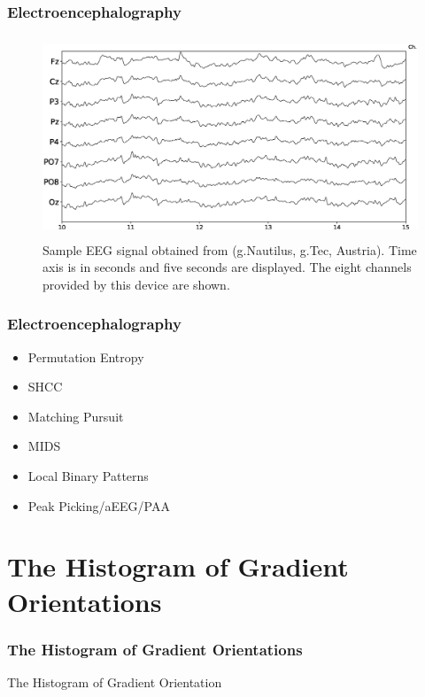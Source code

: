 \documentclass[aspectratio=169]{beamer}
\begin{document}
\begin{frame}
\frametitle{Electroencephalography}
\begin{center}
\begin{figure}[]
\centering
\includegraphics[height=6.0cm,width=14cm]{images/sampleeeg.eps}
\caption[Sample Multichannel EEG signal]{Sample EEG signal obtained from (g.Nautilus, g.Tec, Austria). Time axis is in seconds and five seconds are displayed.  The eight channels provided by this device are shown.}
\label{fig:sampleeeg}
\end{figure}
\end{center}
\end{frame}

\begin{frame}
\frametitle{Electroencephalography}
\begin{center}
\begin{itemize}
 \item<1-> Permutation Entropy
 \item<2-> SHCC
 \item<3-> Matching Pursuit
 \item<4-> MIDS
 \item<5-> Local Binary Patterns
 \item<6-> Peak Picking/aEEG/PAA
\end{itemize}
\end{center}
\end{frame}


\section{The Histogram of Gradient Orientations}    
\begin{frame}
\frametitle{The Histogram of Gradient Orientations}
\begin{center}
\LARGE The Histogram of Gradient Orientation
\end{center}
\end{frame}
\end{document}
